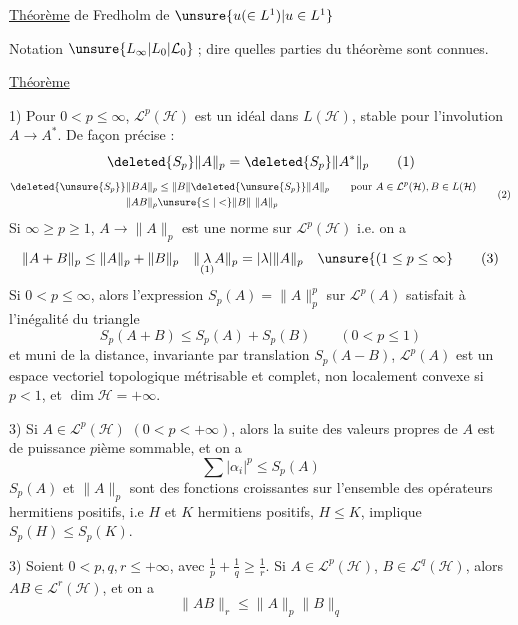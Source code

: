 \uline{Théorème}  de Fredholm de $\unsure{u(\in L^1)|u\in L^1}$ 

Notation $\unsure{L_\infty|L_0|\mathcal L_0}$\,; dire   quelles
parties du  théorème \unsure{--} sont connues.

\uline{Théorème}

1) Pour  $0<p\leq\infty$, $\mathcal L^p(\mathcal H)$ est un idéal 
dans $L(\mathcal H)$, stable pour l'involution $A\to A^*$. De
 façon précise :
\[
\deleted{S_p}\|A\|_p=\deleted{S_p}\|A^*\|_p \tag*{(1)}
\]
\[
\begin{aligned}
\deleted{\unsure{S_p}}\|BA\|_p&\leq\|B\|\deleted{\unsure{S_p}}\|A\|_p
\qquad\text{pour } A\in\mathcal L^p(\mathcal H),B\in L(\mathcal H)\\
\|AB\|_p&\unsure{\leq|<}\|B\|\ \|A\|_p
\end{aligned}\tag*{(2)}
\]
Si $\infty\geq p\geq1$, $A\to\|A\|_p$ est une norme sur $\mathcal L^p(\mathcal H)$ 
i.e. on a
\[
\|A+B\|_p\leq\|A\|_p+\|B\|_p\quad\|\underset{\text{(1)}}{\lambda} A\|_p=|\lambda|\|A\|_p
\quad\unsure{(1\leq p\leq\infty}\tag*{(3)}
\]
Si $0<p\leq\infty$, alors l'expression $S_p(A)=\|A\|_p^p$ sur
$\mathcal L^p(A)$ satisfait à l'inégalité du triangle
\[
S_p(A+B)\leq S_p(A)+S_p(B)\qquad(0<p\leq1)\tag*{(4)}
\]
et muni de la distance, invariante par translation
$S_p(A-B)$, $\mathcal L^p(A)$ est un espace vectoriel topologique
métrisable et complet, non localement convexe
si $p<1$, et $\dim\mathcal H=+\infty$.

3) Si $A\in\mathcal L^p(\mathcal H)$ $(0<p<+\infty)$, alors la suite
des valeurs propres  de $A$ est de puissance
$p$ième sommable, et on a
\[
\sum|\alpha_i|^p\leq S_p(A)\tag*{(5)}
\]
$S_p(A)$ et $\|A\|_p$ sont des fonctions croissantes
sur l'ensemble des opérateurs hermitiens
positifs, i.e $H$ et $K$ hermitiens positifs, $H\leq K$,
implique $S_p(H)\leq S_p(K)$.

3) Soient $0<p,q,r\leq+\infty$, avec $\frac{1}{p}+\frac{1}{q}\geq\frac{1}{r}$. Si 
$A\in\mathcal L^p(\mathcal H)$, $B\in\mathcal L^q(\mathcal H)$, alors $AB\in\mathcal L^r(\mathcal H)$, et on a
\[
\|AB\|_r\leq\|A\|_p\|B\|_q\tag*{(6)}
\]

